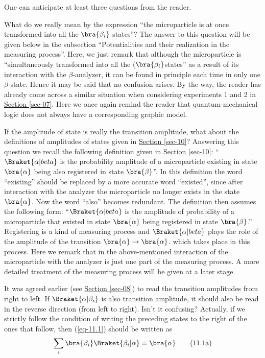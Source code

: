 \documentclass[a4paper,sfsidenotes,colorlinks=true]{tufte-book}
\numberwithin{equation}{section}
\numberwithin{figure}{section}
\begin{document}
One can anticipate at least three questions from the reader. 
\begin{description}[leftmargin=1cm]
\item[First question:] What do we really mean by the expression ``the
  microparticle is at once transformed into all the $\bra{\beta_{i}}$
  states''? The answer to this question will be given below in the
  subsection ``Potentialities and their realization in the measuring
  process''. Here, we just remark that although the microparticle is
  ``simultaneously transformed into all the ($\bra{\beta_{i}}$states''
  as a result of its interaction with the $\beta$-analyzer, it can be
  found in principle each time in only one $\beta$-state. Hence it may
  be said that no confusion arises. By the way, the reader has already
  come across a similar situation when considering experiments 1 and 2
  in \hyperref[sec-07]{Section \ref{sec-07}}. Here we once again
  remind the reader that quantum-mechanical logic does not always have
  a corresponding graphic model.


\item[Second question:] If the amplitude of state is really the
  transition amplitude, what about the definitions of amplitudes of
  states given in \hyperref[sec-10]{Section \ref{sec-10}}? Answering
  this question we recall the following definition given in
  \hyperref[sec-10]{Section \ref{sec-10}}: ``$\Braket{\alpha|beta}$ is
  the probability amplitude of a microparticle existing in state
  $\bra{\alpha}$ being also registered in state $\bra{\beta}$''. In
  this definition the word ``existing'' should be replaced by a more
  accurate word ``existed'', since after interaction with the analyzer
  the microparticle no longer exists in the state $\bra{\alpha}$. Now
  the word ``also'' becomes redundant. The definition then assumes the
  following form: ``$\Braket{\alpha|beta}$ is the amplitude of
  probability of a microparticle that existed in state $\bra{\alpha}$
  being registered in state $\bra{\beta}$.'' Registering is a kind of
  measuring process and $\Braket{\alpha|beta}$ plays the role of the
  amplitude of the transition $\bra{\alpha} \to \bra{\alpha}$. which
  takes place in this process. Here we remark that in the
  above-mentioned interaction of the microparticle with the analyzer
  is just one part of the measuring process. A more detailed treatment
  of the measuring process will be given at a later stage.

\item[Third question:] It was agreed earlier (see
  \hyperref[sec-08]{Section \ref{sec-08}}) to read the transition
  amplitudes from right to left. If $\Braket{\alpha| \beta_{i}}$ is also transition amplitude, it should also be read in the reverse direction (from left to right). Isn't it confusing? Actually, if we strictly follow the condition of writing the preceding states to the right of the ones that follow, then (\ref{eq-11.1}) should be written as
\begin{equation}%
 \sum_{i} \bra{\beta_{i}} \Braket{\beta_{i}|\alpha} = \bra{\alpha}
\tag{11.1a}
\label{eq-11.1a}
\end{equation}
\end{description}
\end{document}
